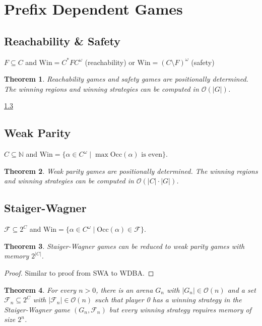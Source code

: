 \documentclass{article}
\newtheorem{theorem}{Theorem}
\begin{document}
\newpage

\section{Prefix Dependent Games}
\subsection{Reachability \& Safety}
$F \subseteq C$ and $\text{Win} = C^* F C^\omega$ (reachability) or $\text{Win} = (C \setminus F)^\omega$ (safety)

\begin{theorem}
	Reachability games and safety games are positionally determined. The winning regions and winning strategies can be computed in $\mathcal{O}(|G|)$.
\end{theorem}
\ref{} %

\subsection{Weak Parity}
$C \subseteq \mathbb{N}$ and $\text{Win} = \{ \alpha \in C^\omega \mid \max \text{Occ}(\alpha) \text{ is even}\}$.

\begin{theorem}
	Weak parity games are positionally determined. The winning regions and winning strategies can be computed in $\mathcal{O}(|C| \cdot |G|)$.
\end{theorem}

\subsection{Staiger-Wagner}
$\mathcal{F} \subseteq 2^C$ and $\text{Win} = \{ \alpha \in C^\omega \mid \text{Occ}(\alpha) \in \mathcal{F} \}$.

\begin{theorem}
	Staiger-Wagner games can be reduced to weak parity games with memory $2^{|C|}$.
\end{theorem}
\begin{proof}
	Similar to proof from SWA to WDBA.
\end{proof}

\begin{theorem}
	For every $n > 0$, there is an arena $G_n$ with $|G_n| \in \mathcal{O}(n)$ and a set $\mathcal{F}_n \subseteq 2^C$ with $|\mathcal{F}_n| \in \mathcal{O}(n)$ such that player 0 has a winning strategy in the Staiger-Wagner game $(G_n, \mathcal{F}_n)$ but every winning strategy requires memory of size $2^n$.
\end{theorem}
\end{document}
